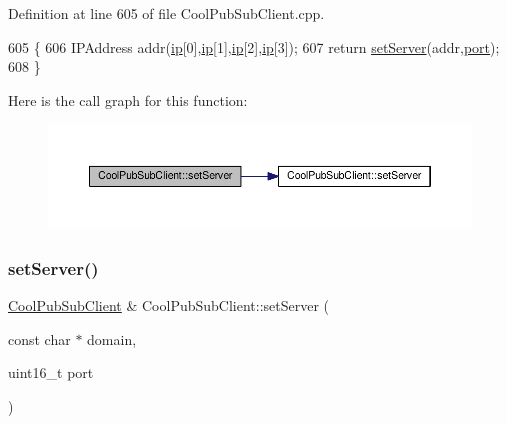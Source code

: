 Definition at line 605 of file Cool\+Pub\+Sub\+Client.\+cpp.


\begin{DoxyCode}
605                                                                          \{
606     IPAddress addr(\hyperlink{class_cool_pub_sub_client_adabd958c6c3462433a3f3393f40a0966}{ip}[0],\hyperlink{class_cool_pub_sub_client_adabd958c6c3462433a3f3393f40a0966}{ip}[1],\hyperlink{class_cool_pub_sub_client_adabd958c6c3462433a3f3393f40a0966}{ip}[2],\hyperlink{class_cool_pub_sub_client_adabd958c6c3462433a3f3393f40a0966}{ip}[3]);
607     \textcolor{keywordflow}{return} \hyperlink{class_cool_pub_sub_client_a947e70c394c66c7d08d0c53caf8425e3}{setServer}(addr,\hyperlink{class_cool_pub_sub_client_a01e3249102c057756af7a515c179844e}{port});
608 \}
\end{DoxyCode}
Here is the call graph for this function\+:\nopagebreak
\begin{figure}[H]
\begin{center}
\leavevmode
\includegraphics[width=350pt]{d8/d4b/class_cool_pub_sub_client_ad589f977fc2799b9341dc5f4fcdb483a_cgraph}
\end{center}
\end{figure}
\mbox{\label{class_cool_pub_sub_client_a333ea9369dc88bb14d3fa6216e731c09}} 
\subsubsection{\texorpdfstring{set\+Server()}{setServer()}\hspace{0.1cm}{\footnotesize\ttfamily [3/3]}}
{\footnotesize\ttfamily \hyperlink{class_cool_pub_sub_client}{Cool\+Pub\+Sub\+Client} \& Cool\+Pub\+Sub\+Client\+::set\+Server (\begin{DoxyParamCaption}\item[{const char $\ast$}]{domain,  }\item[{uint16\+\_\+t}]{port }\end{DoxyParamCaption})}



